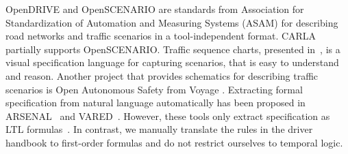 OpenDRIVE \cite{ASAM-OD.2019} and 
OpenSCENARIO \cite{ASAM-OSC.2019}
are standards from Association for Standardization of Automation and Measuring Systems (ASAM)
for describing road networks and traffic scenarios
in a tool-independent format.
CARLA partially supports OpenSCENARIO.
Traffic sequence charts,
presented in~\cite{Damm.2018},
is a visual specification language for capturing scenarios,
that is easy to understand and reason.
Another project that
provides schematics for describing traffic scenarios is Open Autonomous Safety from Voyage \cite{OAS.2018}.
Extracting formal specification from natural language automatically has been proposed in ARSENAL~\cite{ghosh2014automatic} and VARED~\cite{badger2014vared}.
However,
these tools only extract specification as LTL formulas~\cite{pnueli1977temporal}.
In contrast,
we manually translate the rules in the driver handbook to first-order formulas
and do not restrict ourselves to temporal logic.
